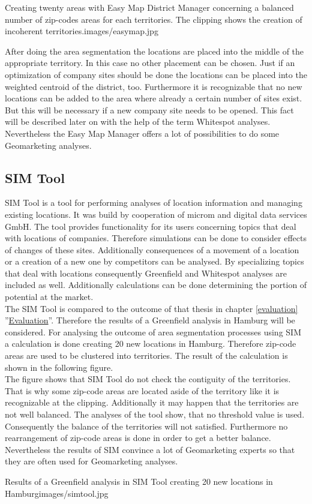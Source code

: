 \begin{figureOwn}{Creating twenty areas with Easy Map District Manager concerning a balanced number of zip-codes areas for each territories. The clipping shows the creation of incoherent territories.}{images/easymap.jpg}\end{figureOwn}


After doing the area segmentation the locations are placed into the middle of the appropriate territory. In this case no other placement can be chosen. Just if an optimization of company sites should be done the locations can be placed into the weighted centroid of the district, too. Furthermore it is recognizable that no new locations can be added to the area where already a certain number of sites exist. But this will be necessary if a new company site needs to be opened. This fact will be described later on with the help of the term Whitespot analyses. Nevertheless the Easy Map Manager offers a lot of possibilities to do some Geomarketing analyses.  

\subsection{SIM Tool}
SIM Tool is a tool for performing analyses of location information and managing existing locations. It was build by cooperation of microm and digital data services GmbH. The tool provides functionality for its users concerning topics that deal with locations of companies. Therefore simulations can be done to consider effects of changes of these sites. Additionally consequences of a movement of a location or a creation of a new one by competitors can be analysed. By specializing topics that deal with locations consequently Greenfield and Whitespot analyses are included as well. Additionally calculations can be done determining the portion of potential at the market. \\
The SIM Tool is compared to the outcome of that thesis in chapter \ref{evaluation} ''\hyperref[evaluation]{Evaluation}''. Therefore the results of a Greenfield analysis in Hamburg will be considered. For analysing the outcome of area segmentation processes using SIM a calculation is done creating 20 new locations in Hamburg. Therefore zip-code areas are used to be clustered into territories. The result of the calculation is shown in the following figure. \\
The figure shows that SIM Tool do not check the contiguity of the territories. That is why some zip-code areas are located aside of the territory like it is recognizable at the clipping. Additionally it may happen that the territories are not well balanced. The analyses of the tool show, that no threshold value is used. Consequently the balance of the territories will not satisfied. Furthermore no rearrangement of zip-code areas is done in order to get a better balance. Nevertheless the results of SIM convince a lot of Geomarketing experts so that they are often used for Geomarketing analyses.

\begin{figureOwn}{Results of a Greenfield analysis in SIM Tool creating 20 new locations in Hamburg}{images/simtool.jpg}\end{figureOwn}

